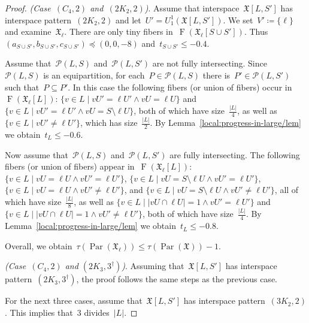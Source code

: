 \documentclass[english,a4paper]{article}
\theoremstyle{plain}
\theoremstyle{definition}
\newcommand{\abs}[1]{| #1 |}
\DeclareMathOperator{\Fibers}{F}
\newcommand{\coherentConfig}{\ensuremath{\mathfrak{X}}}
\newcommand{\fibers}[1]{\ensuremath{\Fibers \left( #1 \right)}}
\newcommand{\interspace}[2]{\ensuremath{\coherentConfig[#1,#2]}}
\newcommand{\equivalenceClasses}[1]{\ensuremath{\mathcal{P}(#1)}}
\DeclareMathOperator{\parameters}{Par}
\newcommand{\ipfourMatching}{\ensuremath{(\disjointCliques{2}{2},2)}}
\newcommand{\ipfourCycle}   {\ensuremath{(\cycle{4},2)}}
\newcommand{\ipsixMatching}             {\ensuremath{(\disjointCliques{3}{2},2)}}
\newcommand{\ipsixTriangle}               {\ensuremath{(\disjointCliques{2}{3},3^\dag)}}
\newcommand{\clique}[1]{\ensuremath{K_{#1}}}
\newcommand{\cycle}[1]{\ensuremath{C_{#1}}}
\newcommand{\disjointCliques}[2]{\ensuremath{#1 \clique{#2}}}
\begin{document}
\begin{proof}
    \textit{(Case~$\ipfourCycle$ and~$\ipfourMatching$)}.
    Assume that interspace~$\interspace{L}{S'}$ has interspace pattern~$\ipfourMatching$ and let~$U' = U^1_1(\interspace{L}{S'})$.
    We set~$V' \coloneqq \{\ell\}$ and examine~$\coherentConfig_\ell$.
    There are only tiny fibers in~$\fibers{\coherentConfig_\ell[S \cup S']}$.
    Thus~$(a_{S \cup S'},b_{S \cup S'}, c_{S \cup S'}) \preceq (0,0,-8)$ and~$t_{S \cup S'} \leq - 0.4$.

    Assume that~$\equivalenceClasses{L,S}$ and~$\equivalenceClasses{L, S'}$ are not fully intersecting.
    Since~$\equivalenceClasses{L,S}$ is an equipartition, for each~$P \in \equivalenceClasses{L,S}$ there is~$P' \in \equivalenceClasses{L,S'}$ such that~$P \subseteq P'$.
    In this case the following fibers (or union of fibers) occur in~$\fibers{\coherentConfig_\ell[L]}$:
    $\{ v \in L \mid v U' =    \ell  U'\wedge v U =             \ell U \}$ and
    $\{ v \in L \mid v U' =    \ell  U'\wedge v U = S \setminus \ell U \}$, both of which have size~$\frac{\abs{L}}{4}$, as well as
    $\{ v \in L \mid v U' \neq \ell  U' \}$, which has size~$\frac{\abs{L}}{2}$.
    By Lemma~\ref{local:progress-in-large/lem} we obtain~$t_L \leq -0.6$.

    Now assume that~$\equivalenceClasses{L,S}$ and~$\equivalenceClasses{L, S'}$ are fully intersecting.
    The following fibers (or union of fibers) appear in~$\fibers{\coherentConfig_\ell[L]}$:
    $\{ v \in L \mid vU =               \ell U\wedge  vU' =    \ell U' \}$,
    $\{ v \in L \mid vU = S \setminus   \ell U\wedge  vU' =    \ell U' \}$,
    $\{ v \in L \mid vU =               \ell U\wedge  vU' \neq \ell U' \}$, and
    $\{ v \in L \mid vU = S \setminus   \ell U\wedge  vU' \neq \ell U' \}$, all of which have size~$\frac{\abs{L}}{8}$, as well as
    $\{ v \in L \mid \abs{vU \cap \ell U} = 1 \wedge  vU' =    \ell U' \}$ and
    $\{ v \in L \mid \abs{vU \cap \ell U} = 1 \wedge  vU' \neq \ell U' \}$, both of which have size~$\frac{\abs{L}}{4}$.
    By Lemma~\ref{local:progress-in-large/lem} we obtain~$t_L \leq -0.8$.

    Overall, we obtain~$\tau(\parameters(\coherentConfig_\ell)) \leq \tau(\parameters(\coherentConfig))- 1$.


    \textit{(Case~$\ipfourCycle$ and $\ipsixTriangle$)}.
    Assuming that~$\interspace{L}{S'}$ has interspace pattern~$\ipsixTriangle$, the proof follows the same steps as the previous case.


    For the next three cases, assume that~$\interspace{L}{S'}$ has interspace pattern~$\ipsixMatching$.
    This implies that~$3$ divides~$|L|$.



\end{proof}
\end{document}
